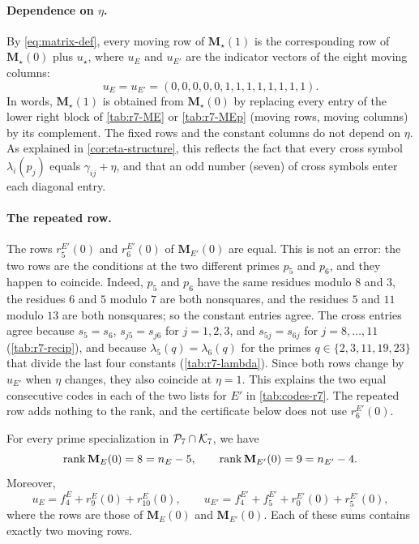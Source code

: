 \paragraph{Dependence on $\eta$.}
By \eqref{eq:matrix-def}, every moving row of $\mathbf M_\star(1)$ is the
corresponding row of $\mathbf M_\star(0)$ plus $u_\star$, where $u_E$ and
$u_{E'}$ are the indicator vectors of the eight moving columns:
\[
 u_E=u_{E'}=(0,0,0,0,0,1,1,1,1,1,1,1,1).
\]
In words, $\mathbf M_\star(1)$ is obtained from $\mathbf M_\star(0)$ by
replacing every entry of the lower right block of \cref{tab:r7-ME} or
\cref{tab:r7-MEp} (moving rows, moving columns) by its complement. The
fixed rows and the constant columns do not depend on $\eta$. As explained
in \cref{cor:eta-structure}, this reflects the fact that every cross symbol
$\lambda_i(p_j)$ equals $\gamma_{ij}+\eta$, and that an odd number (seven)
of cross symbols enter each diagonal entry.

\paragraph{The repeated row.}
The rows $r^{E'}_5(0)$ and $r^{E'}_6(0)$ of $\mathbf M_{E'}(0)$ are equal. This is not
an error: the two rows are the conditions at the two different primes $p_5$
and $p_6$, and they happen to coincide. Indeed, $p_5$ and $p_6$ have the
same residues modulo $8$ and $3$, the residues $6$ and $5$ modulo $7$ are
both nonsquares, and the residues $5$ and $11$ modulo $13$ are both
nonsquares; so the constant entries agree. The cross entries agree because
$s_5=s_6$, $s_{j5}=s_{j6}$ for $j=1,2,3$, and $s_{5j}=s_{6j}$ for
$j=8,\dots,11$ (\cref{tab:r7-recip}), and because $\lambda_5(q)=\lambda_6(q)$
for the primes $q\in\{2,3,11,19,23\}$ that divide the last four constants
(\cref{tab:r7-lambda}). Since both rows change by $u_{E'}$ when $\eta$
changes, they also coincide at $\eta=1$. This explains the two equal
consecutive codes in each of the two lists for $E'$ in
\cref{tab:codes-r7}.
The repeated row adds nothing to the rank, and the certificate below does
not use $r^{E'}_6(0)$.

\begin{lemma}\label{lem:r7-ranks}
For every prime specialization in $\mathcal P_7\cap\mathcal K_7$, we have
\[
 \operatorname{rank}\mathbf M_E(0)=8=n_E-5,\qquad \operatorname{rank}\mathbf M_{E'}(0)=9=n_{E'}-4.
\]
Moreover,
\begin{equation}\label{r7:u-sums}
 u_E=f^E_4+r^E_9(0)+r^E_{10}(0),\qquad u_{E'}=f^{E'}_4+f^{E'}_5+r^{E'}_0(0)+r^{E'}_5(0),
\end{equation}
where the rows are those of $\mathbf M_E(0)$ and $\mathbf M_{E'}(0)$. Each
of these sums contains exactly two moving rows.
\end{lemma}

